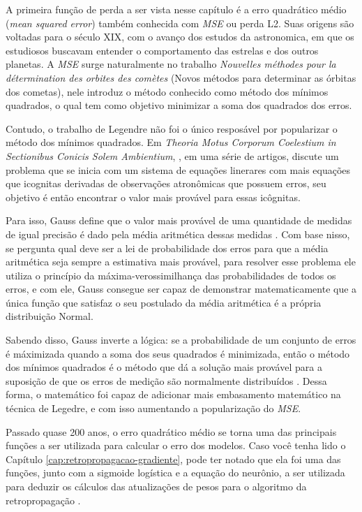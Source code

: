 A primeira função de perda a ser vista nesse capítulo é a erro quadrático médio (\textit{mean squared error}) também conhecida com \textit{MSE} ou perda L2. Suas origens são voltadas para o século XIX, com o avanço dos estudos da astronomica, em que os estudiosos buscavam entender o comportamento das estrelas e dos outros planetas. A \textit{MSE} surge naturalmente no trabalho \textit{Nouvelles méthodes pour la détermination des orbites des comètes} (Novos métodos para determinar as órbitas dos cometas), nele \textcite{Legendre1805} introduz o método conhecido como método dos mínimos quadrados, o qual tem como objetivo minimizar a soma dos quadrados dos erros.

Contudo, o trabalho de Legendre não foi o único resposável por popularizar o método dos mínimos quadrados. Em \textit{Theoria Motus Corporum Coelestium in Sectionibus Conicis Solem Ambientium}, \textcite{Gauss1809}, em uma série de artigos, discute um problema que se inicia com um sistema de equações linerares com mais equações que icognitas derivadas de observações atronômicas que possuem erros, seu objetivo é então encontrar o valor mais provável para essas icôgnitas.

Para isso, Gauss define que o valor mais provável de uma quantidade de medidas de igual precisão é dado pela média aritmética dessas medidas \parencite{Gauss1809}. Com base nisso, \textcite{Gauss1809} se pergunta qual deve ser a lei de probabilidade dos erros para que a média aritmética seja sempre a estimativa mais provável, para resolver esse problema ele utiliza o princípio da máxima-verossimilhança das probabilidades de todos os erros, e com ele, Gauss consegue ser capaz de demonstrar matematicamente que a única função que satisfaz o seu postulado da média aritmética é a própria distribuição Normal.

Sabendo disso, Gauss inverte a lógica: se a probabilidade de um conjunto de erros é máximizada quando a soma dos seus quadrados é minimizada, então o método dos mínimos quadrados é o método que dá a solução mais provável para a suposição de que os erros de medição são normalmente distribuídos \parencite{Gauss1809}. Dessa forma, o matemático foi capaz de adicionar mais embasamento matemático na técnica de Legedre, e com isso aumentando a popularização do \textit{MSE}.

Passado quase 200 anos, o erro quadrático médio se torna uma das principais funções a ser utilizada para calcular o erro dos modelos. Caso você tenha lido o Capítulo \ref{cap:retropropagacao-gradiente}, pode ter notado que ela foi uma das funções, junto com a sigmoide logística e a equação do neurônio, a ser utilizada para deduzir os cálculos das atualizações de pesos para o algoritmo da retropropagação \parencite{BackpropagationArticle}.

